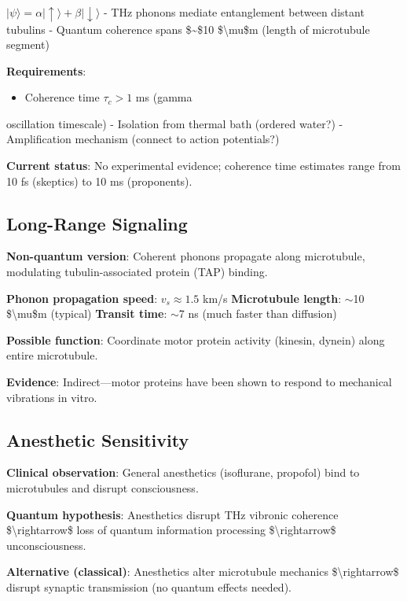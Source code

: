 \(|\psi\rangle = \alpha|\uparrow\rangle + \beta|\downarrow\rangle\) -
THz phonons mediate entanglement between distant tubulins - Quantum
coherence spans \$\sim\$10 \$\textbackslash mu\$m (length of microtubule
segment)

\textbf{Requirements}:
\begin{itemize}
\item Coherence time \(\tau_c > 1\) ms (gamma
\end{itemize}

oscillation timescale) - Isolation from thermal bath (ordered water?) -
Amplification mechanism (connect to action potentials?)

\textbf{Current status}: No experimental evidence; coherence time
estimates range from 10 fs (skeptics) to 10 ms (proponents).

\subsection{Long-Range Signaling}\label{long-range-signaling}

\textbf{Non-quantum version}: Coherent phonons propagate along
microtubule, modulating tubulin-associated protein (TAP) binding.

\textbf{Phonon propagation speed}: \(v_s \approx 1.5\) km/s
\textbf{Microtubule length}: $\sim$10 \$\textbackslash mu\$m
(typical) \textbf{Transit time}: $\sim$7 ns (much faster than
diffusion)

\textbf{Possible function}: Coordinate motor protein activity (kinesin,
dynein) along entire microtubule.

\textbf{Evidence}: Indirect---motor proteins have been shown to
respond to mechanical vibrations in vitro.

\subsection{Anesthetic Sensitivity}\label{anesthetic-sensitivity}

\textbf{Clinical observation}: General anesthetics (isoflurane,
propofol) bind to microtubules and disrupt consciousness.

\textbf{Quantum hypothesis}: Anesthetics disrupt THz vibronic coherence
\$\textbackslash rightarrow\$ loss of quantum information processing
\$\textbackslash rightarrow\$ unconsciousness.

\textbf{Alternative (classical)}: Anesthetics alter microtubule
mechanics \$\textbackslash rightarrow\$ disrupt synaptic transmission
(no quantum effects needed).

